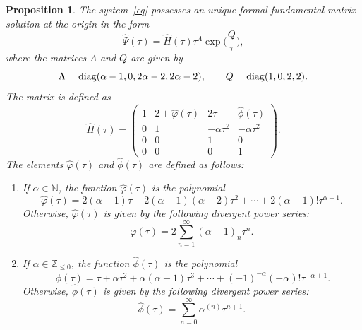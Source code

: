 \documentclass[pdftex]{sigma}
\numberwithin{equation}{section}
\newtheorem{Proposition}[Theorem]{Proposition}
 { \theoremstyle{definition}
\newtheorem{Definition}[Theorem]{Definition}
\newtheorem{Note}[Theorem]{Note}
\newtheorem{Example}[Theorem]{Example}
\newtheorem{Remark}[Theorem]{Remark} }
\begin{document}
 \begin{Proposition}\label{for}
 The system~\eqref{eq} possesses an unique formal fundamental matrix solution at the origin in the form
 \[
 \hat{\Psi}(\tau)=\hat{H}(\tau) \tau^{\Lambda} \exp\biggl(\frac{Q}{\tau}\biggr) ,
 \]
 where the matrices $\Lambda$ and $Q$ are given by
 \begin{equation*}
 \Lambda={\rm diag} (\alpha-1, 0, 2 \alpha -2, 2 \alpha-2),\qquad
 Q={\rm diag}(1, 0, 2, 2) .%
 \end{equation*}
 The matrix  is defined as
 \[
 \hat{H}(\tau)=\begin{pmatrix}
 	 1 & 2+\hat{\varphi}(\tau) & 2 \tau & \hat{\phi}(\tau)\\
 	 0 & 1 & -\alpha \tau^2 & -\alpha \tau^2\\
 	 0 & 0 & 1 & 0\\
 	 0 & 0 & 0 & 1
 	\end{pmatrix} .
 \]
 The elements $\hat{\varphi}(\tau)$ and $\hat{\phi}(\tau)$ are defined as follows:
 \begin{enumerate}
 \itemsep=0pt 	
 \item[$1.$]
 If $\alpha\in\mathbb{N}$, the function $\hat{\varphi}(\tau)$ is the polynomial
 \begin{equation}
 \hat{\varphi}(\tau)= 2 (\alpha-1) \tau + 2 (\alpha-1) (\alpha-2) \tau^2 + \cdots + 2 (\alpha-1)! \tau^{\alpha-1} .\label{fs1}
 \end{equation}
 Otherwise, $\hat{\varphi}(\tau)$ is given by the following divergent power series:
 \[
 \hat{\varphi}(\tau)=2 \sum_{n=1}^{\infty} (\alpha-1)_n \tau^n .
 \]

 \item[$2.$]
 If $\alpha\in\mathbb{Z}_{\leq 0}$, the function $\hat{\phi}(\tau)$ is the polynomial
 \begin{equation}\
 \hat{\phi}(\tau)=\tau + \alpha \tau^2 + \alpha (\alpha+1) \tau^3 + \cdots + (-1)^{-\alpha} (-\alpha)! \tau^{-\alpha+1} .\label{fs2}
 \end{equation}
 Otherwise, $\hat{\phi}(\tau)$ is given by the following divergent power series:
 \[
 \hat{\phi}(\tau)=\sum_{n=0}^{\infty} \alpha^{(n)} \tau^{n+1} .
 \]
 \end{enumerate}
 \end{Proposition}
\end{document}
